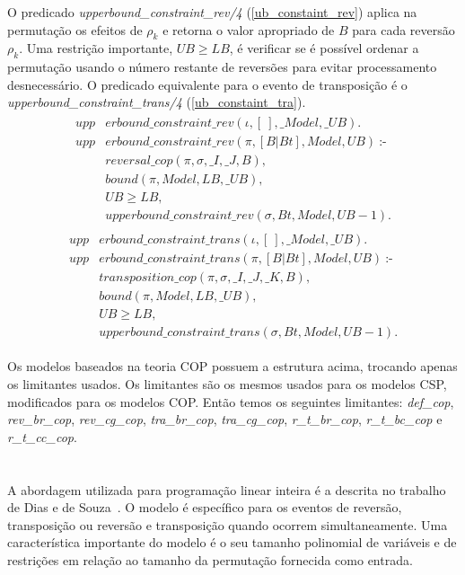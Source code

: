 O predicado \textit{upperbound\_constraint\_rev/4}
(\ref{ub_constaint_rev}) aplica na permutação os efeitos de $\rho_{k}$ e
retorna o valor apropriado de $B$ para cada reversão $\rho_{k}$. Uma
restrição importante, $UB \ge LB$, é verificar se é possível ordenar a
permutação usando o número restante de reversões para evitar
processamento desnecessário. O predicado equivalente para o evento de
transposição é o \textit{upperbound\_constraint\_trans/4}
(\ref{ub_constaint_tra}).
\begin{align}
  \label{ub_constaint_rev}
  \begin{split}
  \textit{upp}&\textit{erbound\_constraint\_rev}(\iota, [~], \_Model, \_UB). \\
  \textit{upp}&\textit{erbound\_constraint\_rev}(\pi, [B|Bt], Model, UB)~\text{:-} \\
  &\textit{reversal\_cop}(\pi, \sigma, \_I, \_J, B), \\
  &\textit{bound}(\pi, Model, LB, \_UB), \\
  &UB \ge LB,  \\
  &\textit{upperbound\_constraint\_rev}(\sigma, Bt, Model, UB - 1).
  \end{split}
\end{align}
\begin{align}
  \label{ub_constaint_tra}
  \begin{split}
  \textit{upp}&\textit{erbound\_constraint\_trans}(\iota, [~], \_Model, \_UB). \\
  \textit{upp}&\textit{erbound\_constraint\_trans}(\pi, [B|Bt], Model, UB)~\text{:-} \\
  &\textit{transposition\_cop}(\pi, \sigma, \_I, \_J, \_K, B), \\
  &\textit{bound}(\pi, Model, LB, \_UB), \\
  &UB \ge LB,  \\
  &\textit{upperbound\_constraint\_trans}(\sigma, Bt, Model, UB - 1).
  \end{split}
\end{align}

Os modelos baseados na teoria COP possuem a estrutura acima, trocando
apenas os limitantes usados. Os limitantes são os mesmos usados para os
modelos CSP, modificados para os modelos COP\@. Então temos os seguintes
limitantes: \textit{def\_cop}, \textit{rev\_br\_cop},
\textit{rev\_cg\_cop}, \textit{tra\_br\_cop}, \textit{tra\_cg\_cop},
\textit{r\_t\_br\_cop}, \textit{r\_t\_bc\_cop} e \textit{r\_t\_cc\_cop}.

\section{\PLI}
\label{sec:pli}
A abordagem utilizada para programação linear inteira é a descrita no
trabalho de Dias e de Souza~\cite{DiasSouza*2007}. O modelo é específico
para os eventos de reversão, transposição ou reversão e transposição
quando ocorrem simultaneamente. Uma característica importante do modelo
é o seu tamanho polinomial de variáveis e de restrições em relação ao
tamanho da permutação fornecida como entrada.

